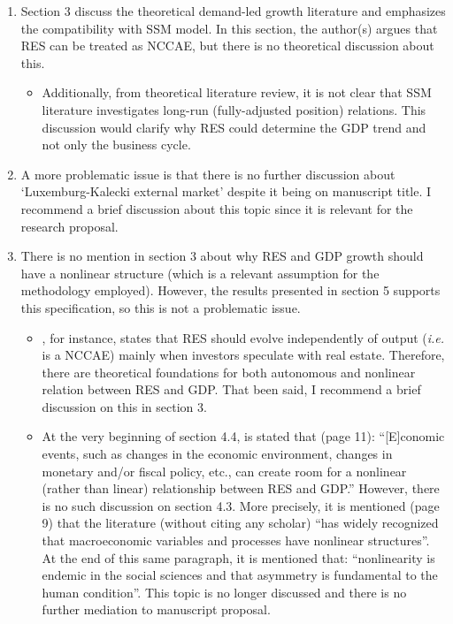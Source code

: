 \documentclass[11pt]{article}
\begin{document}
\begin{enumerate}
\item Section 3 discuss the theoretical demand-led growth literature and emphasizes the compatibility with SSM model. In this section, the author(s) argues that RES can be treated as NCCAE, but there is no theoretical discussion about this.

\begin{itemize}
\item Additionally, from theoretical literature review, it is not clear that SSM literature investigates long-run (fully-adjusted position) relations. This discussion would clarify why RES could determine the GDP trend and not only the business cycle.
\end{itemize}

\item A more problematic issue is that there is no further discussion about `Luxemburg-Kalecki external market' despite it being on manuscript title. I recommend a brief discussion about this topic since it is relevant for the research proposal.

\item There is no mention in section 3 about why RES and GDP growth should have a nonlinear structure (which is a relevant assumption for the methodology employed). However, the results presented in section 5 supports this specification, so this is not a problematic issue.

\begin{itemize}
\item \textcite{duesenberry_investment_1958}, for instance, states that RES should evolve independently of output (\emph{i.e.} is a NCCAE) mainly when investors speculate with real estate. Therefore, there are theoretical foundations for both autonomous and nonlinear relation between RES and GDP. That been said, I recommend a brief discussion on this in section 3.

\item At the very beginning of section 4.4, is stated that (page 11): ``[E]conomic events, such as changes in the economic environment, changes in monetary and/or fiscal policy, etc., can create room for a nonlinear (rather than linear) relationship between RES and GDP.'' However, there is no such discussion on section 4.3. More precisely, it is mentioned (page 9) that the literature (without citing any scholar) ``has widely recognized that macroeconomic variables and processes have nonlinear structures''. At the end of this same paragraph, it is mentioned that: ``nonlinearity is endemic in the social sciences and that asymmetry is fundamental to the human condition''. This topic is no longer discussed and there is no further mediation to manuscript proposal.
\end{itemize}


\end{enumerate}
\end{document}
